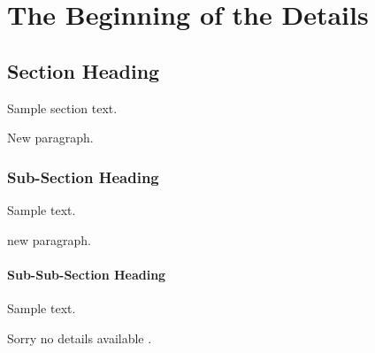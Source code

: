 \chapter{The Beginning of the Details}
\section{Section Heading}
Sample section text.

New paragraph.

\subsection{Sub-Section Heading}
Sample text.

new paragraph.

\subsubsection{Sub-Sub-Section Heading}
Sample text.

Sorry no details available \cite{Smith,doe2}.
